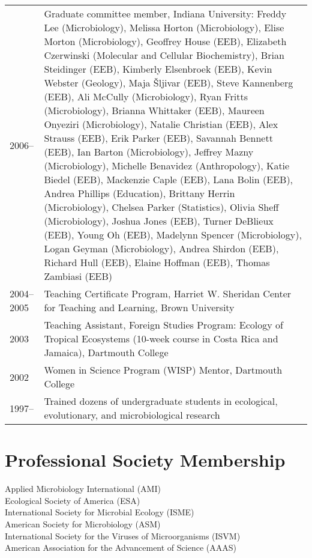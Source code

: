 \documentclass[11pt]{article}
\begin{document}
\begin{longtable}{@{}p{4em}@{\hspace{2em}}p{}@{}}
2006-- & Graduate committee member, Indiana University: Freddy Lee (Microbiology), Melissa Horton (Microbiology), Elise Morton (Microbiology), Geoffrey House (EEB), Elizabeth Czerwinski (Molecular and Cellular Biochemistry), Brian Steidinger (EEB), Kimberly Elsenbroek (EEB), Kevin Webster (Geology), Maja Šljivar (EEB), Steve Kannenberg (EEB), Ali McCully (Microbiology), Ryan Fritts (Microbiology), Brianna Whittaker (EEB), Maureen Onyeziri (Microbiology), Natalie Christian (EEB), Alex Strauss (EEB), Erik Parker (EEB), Savannah Bennett (EEB), Ian Barton (Microbiology), Jeffrey Mazny (Microbiology), Michelle Benavidez (Anthropology), Katie Biedel (EEB), Mackenzie Caple (EEB), Lana Bolin (EEB), Andrea Phillips (Education), Brittany Herrin (Microbiology), Chelsea Parker (Statistics), Olivia Sheff (Microbiology), Joshua Jones (EEB), Turner DeBlieux (EEB), Young Oh (EEB), Madelynn Spencer (Microbiology), Logan Geyman (Microbiology), Andrea Shirdon (EEB), Richard Hull (EEB), Elaine Hoffman (EEB), Thomas Zambiasi (EEB) \\

2004--2005 & Teaching Certificate Program, Harriet W. Sheridan Center for Teaching and Learning, Brown University \\

2003       & Teaching Assistant, Foreign Studies Program: Ecology of Tropical Ecosystems (10-week course in Costa Rica and Jamaica), Dartmouth College \\

2002       & Women in Science Program (WISP) Mentor, Dartmouth College \\

1997--     & Trained dozens of undergraduate students in ecological, evolutionary, and microbiological research \\
\end{longtable}

\section*{Professional Society Membership}
\vspace{-0.5em}
\noindent Applied Microbiology International (AMI)\\[0.5em]
\noindent Ecological Society of America (ESA)\\[0.5em]
\noindent International Society for Microbial Ecology (ISME)\\[0.5em]
\noindent American Society for Microbiology (ASM)\\[0.5em]
\noindent International Society for the Viruses of Microorganisms (ISVM)\\[0.5em]
\noindent American Association for the Advancement of Science (AAAS)\\
\end{document}
